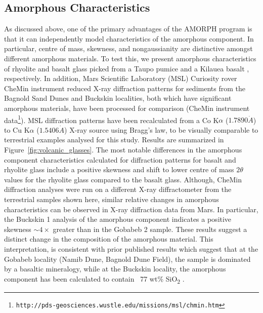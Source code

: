 \documentclass[preprint, a4paper]{elsarticle}
\begin{document}
\subsection{Amorphous Characteristics}
As discussed above, one of the primary advantages of the AMORPH program is that it can
independently model characteristics of the amorphous component.  In particular, centre of mass,
skewness, and nongaussianity are distinctive amongst different amorphous materials. To test
this, we present amorphous characteristics of rhyolite and basalt glass picked from a
Taupo pumice \citep[73.5 wt\% SiO\textsubscript{2}; P2166C;][]{barker2015} and a Kilauea basalt
\citep[51 wt\% SiO\textsubscript{2}; KS08-108E;][]{wooten2009, rowe2015}, respectively.
In addition, Mars Scientific Laboratory (MSL) Curiosity rover CheMin instrument reduced X-ray diffraction patterns
for sediments from the Bagnold Sand Dunes \citep[Gobabeb;][]{achilles2017, lapotre2017}
and Buckskin \citep{morris2016} localities, both which have significant amorphous
materials, have been processed for comparison (CheMin instrument data\footnote{\tt http://pds-geosciences.wustle.edu/missions/msl/chmin.htm}). MSL diffraction patterns have been
recalculated from a Co K$\alpha$ ($1.7890 \dot{A}$) to Cu K$\alpha$ ($1.5406 \dot{A}$) X-ray source using Bragg's law, to be visually comparable to terrestrial
examples analysed for this study. Results are summarized in Figure~\ref{fig:volcanic_glasses}. The most notable differences in the amorphous component characteristics calculated for diffraction patterns for basalt and rhyolite glass include a positive skewness and shift to lower centre of mass
$2\theta$ values for the rhyolite glass compared to the basalt glass. Although, CheMin
diffraction analyses were run on a different X-ray diffractometer from the terrestrial
samples shown here, similar relative changes in amorphous characteristics can be observed
in X-ray diffraction data from Mars. In particular, the Buckskin 1 analysis of the amorphous component indicates a positive skewness $\sim 4\times$ greater than in the Gobabeb 2 sample. These results suggest a distinct change in the
composition of the amorphous material. This interpretation, is consistent with prior
published results which suggest that at the Gobabeb locality (Namib Dune, Bagnold Dune Field),
the sample is dominated by a basaltic mineralogy, while at the Buckskin locality,
the amorphous component has been calculated to contain ~77 wt\% SiO\textsubscript{2}
\citep[i.e. rhyolitic;][]{morris2016, achilles2017}. 
\end{document}
